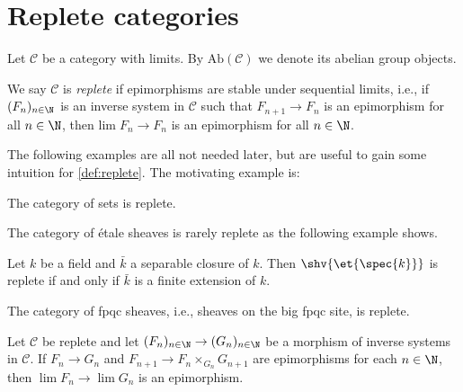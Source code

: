 \chapter{Replete categories}

Let $\mathcal{C}$ be a category with limits. By
$\mathrm{Ab}(\mathcal{C})$ we denote its abelian group objects.

\begin{definition}
    We say $\mathcal{C}$ is \emph{replete} if epimorphisms are stable under sequential limits, i.e.,
    if $(F_n)_{n \in \N}$ is an inverse system in $\mathcal{C}$ such that
    $F_{n+1} \to F_n$ is an epimorphism for all $n \in \N$, then $\mathrm{lim}\; F_n \to F_n$ is
    an epimorphism for all $n \in \N$.
    \label{def:replete}
\end{definition}

The following examples are all not needed later, but are useful to gain some intuition for
\ref{def:replete}. The motivating example is:

\begin{example}
    The category of sets is replete.
    \label{ex:replete-sets}
\end{example}

The category of étale sheaves is rarely replete as the following example shows.

\begin{example}
    Let $k$ be a field and $\bar k$ a separable closure of $k$. Then $\shv{\et{\spec{k}}}$ is replete
    if and only if $\bar k$ is a finite extension of $k$.
    \label{ex:replete-etale-site}
\end{example}

\begin{example}
    The category of fpqc sheaves, i.e., sheaves on the big fpqc site, is replete.
    \label{ex:replete-fpqc-site}
\end{example}

\begin{lemma}
    Let $\mathcal{C}$ be replete and let $(F_n)_{n \in \N} \to (G_n)_{n \in \N}$ be a morphism
    of inverse systems in $\mathcal{C}$. If
    $F_n \to G_n$ and $F_{n+1} \to F_{n} \times_{G_n} G_{n+1}$ are epimorphisms for each $n \in \N$, then
    $\lim F_n \to \lim G_n$ is an epimorphism.
    \label{lemma:replete-lim-lim-epi}
\end{lemma}

